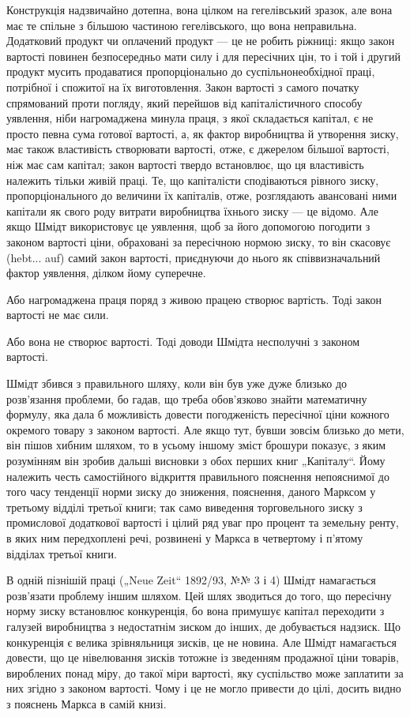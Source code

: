 Конструкція надзвичайно дотепна, вона цілком на гегелівський
зразок, але вона має те спільне з більшою частиною гегелівського,
що вона неправильна. Додатковий продукт чи оплачений
продукт — це не робить ріжниці: якщо закон вартості повинен
безпосередньо мати силу і для пересічних цін, то і той і другий
продукт мусить продаватися пропорціонально до суспільнонеобхідної
праці, потрібної і спожитої на їх виготовлення. Закон
вартості з самого початку спрямований проти погляду, який перейшов
від капіталістичного способу уявлення, ніби нагромаджена
минула праця, з якої складається капітал, є не просто певна сума
готової вартості, а, як фактор виробництва й утворення зиску, має
також властивість створювати вартості, отже, є джерелом більшої
вартості, ніж має сам капітал; закон вартості твердо встановлює,
що ця властивість належить тільки живій праці. Те, що капіталісти
сподіваються рівного зиску, пропорціонального до величини
їх капіталів, отже, розглядають авансовані ними капітали як свого
роду витрати виробництва їхнього зиску — це відомо. Але якщо
Шмідт використовує це уявлення, щоб за його допомогою погодити
з законом вартості ціни, обраховані за пересічною нормою
зиску, то він скасовує (hebt... auf) самий закон вартості, приєднуючи
до нього як співвизначальний фактор уявлення, ділком
йому суперечне.

Або нагромаджена праця поряд з живою працею створює
вартість. Тоді закон вартості не має сили.

Або вона не створює вартості. Тоді доводи Шмідта несполучні
з законом вартості.

Шмідт збився з правильного шляху, коли він був уже дуже
близько до розв’язання проблеми, бо гадав, що треба обов’язково
знайти математичну формулу, яка дала б можливість довести
погодженість пересічної ціни кожного окремого товару з законом
вартості. Але якщо тут, бувши зовсім близько до мети, він
пішов хибним шляхом, то в усьому іншому зміст брошури показує,
з яким розумінням він зробив дальші висновки з обох перших
книг „Капіталу“. Йому належить честь самостійного відкриття
правильного пояснення непояснимої до того часу тенденції норми
зиску до зниження, пояснення, даного Марксом у третьому відділі
третьої книги; так само виведення торговельного зиску з
промислової додаткової вартості і цілий ряд уваг про процент
та земельну ренту, в яких ним передхоплені речі, розвинені у
Маркса в четвертому і п’ятому відділах третьої книги.

В одній пізнішій праці („Neue Zeit“ 1892/93, №№ 3 і 4)
Шмідт намагається розв’язати проблему іншим шляхом. Цей
шлях зводиться до того, що пересічну норму зиску встановлює
конкуренція, бо вона примушує капітал переходити з галузей
виробництва з недостатнім зиском до інших, де добувається
надзиск. Що конкуренція є велика зрівняльниця зисків, це не
новина. Але Шмідт намагається довести, що це нівелювання
зисків тотожне із зведенням продажної ціни товарів, вироблених
понад міру, до такої міри вартості, яку суспільство може
заплатити за них згідно з законом вартості. Чому і це не
могло привести до цілі, досить видно з пояснень Маркса в самій
книзі.

